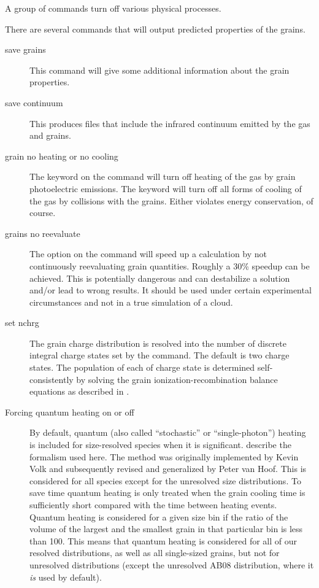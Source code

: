 A group of  commands
turn off various physical processes.

There are several  commands that
will output predicted properties
of the grains.

\begin{description}
\item[save grains] 
This command will give
some additional information about the grain properties.

\item[save continuum]
This produces files that include the infrared
continuum emitted by the gas and grains.

\item[grain no heating or no cooling]  The keyword
 on the 
command will turn off heating of the gas by grain photoelectric emissions.
The keyword  will turn off all forms of cooling of the gas by
collisions with the grains.
Either violates energy conservation, of course.

\item[grains no reevaluate]  The  option
on the
 command
will speed up a calculation by not continuously reevaluating grain
quantities.
Roughly a 30\% speedup can be achieved.
This is potentially
dangerous and can destabilize a solution and/or lead to wrong results.
It should be used under certain experimental circumstances and
not in a true simulation of a cloud.

\item[set nchrg]  The grain charge distribution is resolved
into the number
of discrete integral charge states set by the  command.
The default is two charge states.
The population of each of charge state is determined
self-consistently by solving the grain ionization-recombination
balance equations as described in \citet{VanHoof2004}.

\item[Forcing quantum heating on or off]  
By default,
quantum (also called ``stochastic'' or ``single-photon'') heating
is included for size-resolved
species when it is significant.
\citet{Guhathakurta1989} describe
the formalism used here.
The method was originally implemented by Kevin
Volk and subsequently revised and generalized by Peter van Hoof.
This is
considered for all species except for the unresolved size distributions.
To save time quantum heating is only treated when the grain cooling time
is sufficiently short compared with the time between heating events.  Quantum
heating is considered for a given size bin if the ratio of the volume of
the largest and the smallest grain in that particular bin is less than 100.
This means that quantum heating is considered for all of our resolved
distributions, as well as all single-sized grains,
but not for unresolved
distributions (except the unresolved AB08 distribution, where it
\emph{is} used by default).


\end{description}

